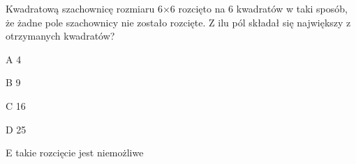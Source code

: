 \begin{tresc}
Kwadratową szachownicę rozmiaru 6×6 rozcięto na 6 kwadratów w taki sposób, że żadne pole szachownicy nie zostało rozcięte. Z ilu pól składał się największy z otrzymanych kwadratów?
\end{tresc}
\begin{wariant}{A} 4 \end{wariant}
\begin{wariant}{B} 9 \end{wariant}
\begin{wariant}{C} 16 \end{wariant}
\begin{wariant}{D} 25 \end{wariant}
\begin{wariant}{E} takie rozcięcie jest niemożliwe \end{wariant}
